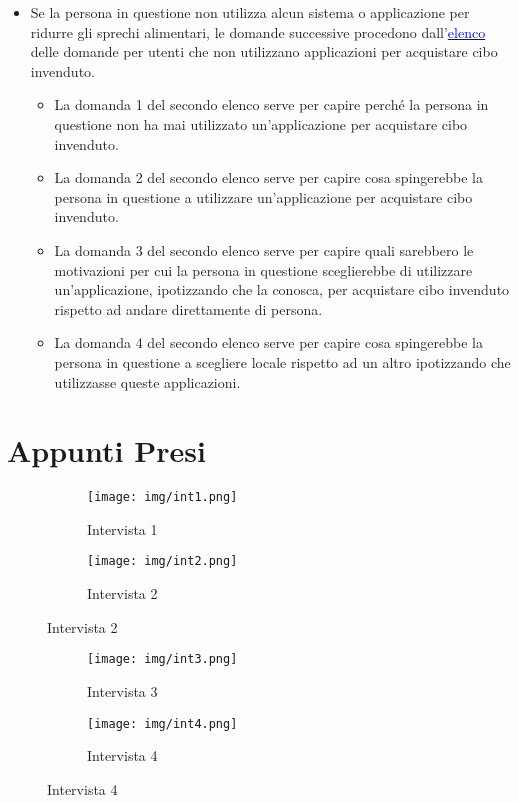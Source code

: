 \documentclass{article}
\begin{document}
\begin{itemize}
\begin{itemize}
    \end{itemize}
    \item Se la persona in questione non utilizza alcun sistema o applicazione per ridurre gli sprechi alimentari, le domande successive procedono dall'\hyperref[dom_non_utilizzatori]{\textcolor{blue}{elenco}} delle domande per utenti che non utilizzano applicazioni per acquistare cibo invenduto.
    \begin{itemize}
        \item La domanda 1 del secondo elenco serve per capire perché la persona in questione non ha mai utilizzato un'applicazione per acquistare cibo invenduto.
        \item La domanda 2 del secondo elenco serve per capire cosa spingerebbe la persona in questione a utilizzare un'applicazione per acquistare cibo invenduto.
        \item La domanda 3 del secondo elenco serve per capire quali sarebbero le motivazioni per cui la persona in questione sceglierebbe di utilizzare un'applicazione, ipotizzando che la conosca, per acquistare cibo invenduto rispetto ad andare direttamente di persona.
        \item La domanda 4 del secondo elenco serve per capire cosa spingerebbe la persona in questione a scegliere locale rispetto ad un altro ipotizzando che utilizzasse queste applicazioni.
    \end{itemize}
\end{itemize}

\newpage
\section{Appunti Presi}

\begin{figure}[h]
    \centering
    \begin{subfigure}{0.40\textwidth}
        \centering
        \texttt{[image: img/int1.png]}
        \caption{Intervista 1}
    \end{subfigure}
    \hfill
    \begin{subfigure}{0.40\textwidth}
        \centering
        \texttt{[image: img/int2.png]}
        \caption{Intervista 2}
    \end{subfigure}
\end{figure}

\begin{figure}[h]
    \centering
    \begin{subfigure}{0.40\textwidth}
        \centering
        \texttt{[image: img/int3.png]}
        \caption{Intervista 3}
    \end{subfigure}
    \hfill
    \begin{subfigure}{0.40\textwidth}
        \centering
        \texttt{[image: img/int4.png]}
        \caption{Intervista 4}
    \end{subfigure}
\end{figure}
\end{document}
